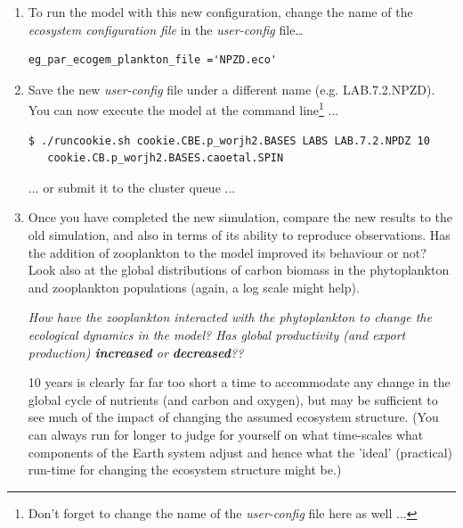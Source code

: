 \begin{enumerate}[noitemsep]
\vspace{2mm}
\item To run the model with this new configuration, change the name of the \textit{ecosystem configuration file} in the \textit{user-config} file\dots
\small\begin{verbatim}
eg_par_ecogem_plankton_file ='NPZD.eco'
\end{verbatim}\normalsize

\vspace{1mm}
\item Save the new \textit{user-config} file under a different name (e.g. \textsf{\footnotesize LAB.7.2.NPZD}). You can now execute the model at the command line\footnote{Don't forget to change the name of the \textit{user-config} file here as well ...} ...
\vspace{-1mm}\small\begin{verbatim}
$ ./runcookie.sh cookie.CBE.p_worjh2.BASES LABS LAB.7.2.NPDZ 10 
   cookie.CB.p_worjh2.BASES.caoetal.SPIN
\end{verbatim}\normalsize\vspace{-1mm}
... or submit it to the cluster queue ...

\vspace{1mm}
\item Once you have completed the new simulation, compare the new results to the old simulation, and also in terms of its ability to reproduce observations. Has the addition of zooplankton to the model improved its behaviour or not? Look also at the global distributions of carbon biomass in the phytoplankton and zooplankton populations (again, a log scale might help).

\vspace{1mm}
\textit{How have the zooplankton interacted with the phytoplankton to change the ecological dynamics in the model? Has global productivity (and export production) \textbf{increased} or \textbf{decreased}??}

\vspace{1mm}
10 years is clearly far far too short a time to accommodate any change in the global cycle of nutrients (and carbon and oxygen), but may be sufficient to see much of the impact of changing the assumed ecosystem structure. (You can always run for longer to judge for yourself on what time-scales what components of the Earth system adjust and hence what the 'ideal' (practical) run-time for changing the ecosystem structure might be.)

\end{enumerate}

